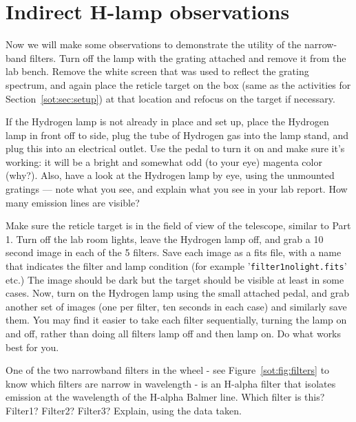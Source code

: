 \section{Indirect H-lamp observations}\label{sot:sec:h-lamp}

\begin{steps}
	\item Now we will make some observations to demonstrate the utility of the narrow-band filters.
	Turn off the lamp with the grating attached and remove it from the lab bench. Remove the
	white screen that was used to reflect the grating spectrum, and again place the reticle target
	on the box (same as the activities for Section~\ref{sot:sec:setup}) at that location and refocus on the target if necessary.
	
	\item If the Hydrogen lamp is not already in place and set up, place the Hydrogen lamp in front
	off to side, plug the tube of Hydrogen gas into the lamp stand, and plug this
	into an electrical outlet. Use the pedal to turn it on and make sure it’s working: it will be
	a bright and somewhat odd (to your eye) magenta color (why?). Also, have a look at the
	Hydrogen lamp by eye, using the unmounted gratings --- note what you see, and explain what you
	see in your lab report. How many emission lines are visible?
	
	\item Make sure the reticle target is in the field of view of the telescope, similar to Part 1. Turn
	off the lab room lights, leave the Hydrogen lamp off, and grab a 10 second image in each of
	the 5 filters. Save each image as a fits file, with a name that indicates the filter and lamp
	condition (for example ’\texttt{filter1nolight.fits}’ etc.) The image should be dark but the target should
	be visible at least in some cases. Now, turn on the Hydrogen lamp using the small attached
	pedal, and grab another set of images (one per filter, ten seconds in each case) and similarly
	save them. You may find it easier to take each filter sequentially, turning the lamp on and
	off, rather than doing all filters lamp off and then lamp on. Do what works best for you.
	
	\item One of the two narrowband filters in the wheel - see Figure~\ref{sot:fig:filters} to know
	which filters are narrow in wavelength - is an H-alpha filter that isolates emission at the
	wavelength of the H-alpha Balmer line. Which filter is this? Filter1? Filter2? Filter3?
	Explain, using the data taken.
\end{steps}

